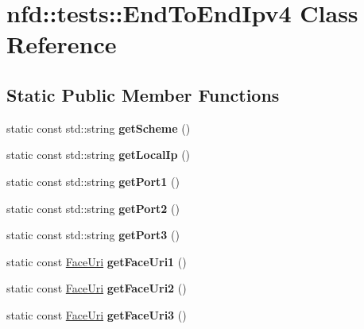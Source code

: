 \hypertarget{classnfd_1_1tests_1_1EndToEndIpv4}{}\section{nfd\+:\+:tests\+:\+:End\+To\+End\+Ipv4 Class Reference}
\label{classnfd_1_1tests_1_1EndToEndIpv4}
\subsection*{Static Public Member Functions}
\begin{DoxyCompactItemize}
\item 
static const std\+::string {\bfseries get\+Scheme} ()\hypertarget{classnfd_1_1tests_1_1EndToEndIpv4_a7c4e068f04b470f1078fffa3541acfc8}{}\label{classnfd_1_1tests_1_1EndToEndIpv4_a7c4e068f04b470f1078fffa3541acfc8}

\item 
static const std\+::string {\bfseries get\+Local\+Ip} ()\hypertarget{classnfd_1_1tests_1_1EndToEndIpv4_a4963dc57fb3bcc704a2dc2bdcd09b6a7}{}\label{classnfd_1_1tests_1_1EndToEndIpv4_a4963dc57fb3bcc704a2dc2bdcd09b6a7}

\item 
static const std\+::string {\bfseries get\+Port1} ()\hypertarget{classnfd_1_1tests_1_1EndToEndIpv4_a8757727abb1e46743972c6225240ef4d}{}\label{classnfd_1_1tests_1_1EndToEndIpv4_a8757727abb1e46743972c6225240ef4d}

\item 
static const std\+::string {\bfseries get\+Port2} ()\hypertarget{classnfd_1_1tests_1_1EndToEndIpv4_a9fb3d16ab607ad31ae1c3f54e1d9059f}{}\label{classnfd_1_1tests_1_1EndToEndIpv4_a9fb3d16ab607ad31ae1c3f54e1d9059f}

\item 
static const std\+::string {\bfseries get\+Port3} ()\hypertarget{classnfd_1_1tests_1_1EndToEndIpv4_af70963ee1f07ccbd85850bc13c5b4765}{}\label{classnfd_1_1tests_1_1EndToEndIpv4_af70963ee1f07ccbd85850bc13c5b4765}

\item 
static const \hyperlink{classndn_1_1util_1_1FaceUri}{Face\+Uri} {\bfseries get\+Face\+Uri1} ()\hypertarget{classnfd_1_1tests_1_1EndToEndIpv4_a9474865feb2d24e6ea1d2398b2544dd2}{}\label{classnfd_1_1tests_1_1EndToEndIpv4_a9474865feb2d24e6ea1d2398b2544dd2}

\item 
static const \hyperlink{classndn_1_1util_1_1FaceUri}{Face\+Uri} {\bfseries get\+Face\+Uri2} ()\hypertarget{classnfd_1_1tests_1_1EndToEndIpv4_a1b5a1c77e832624420e81ea7b56ba657}{}\label{classnfd_1_1tests_1_1EndToEndIpv4_a1b5a1c77e832624420e81ea7b56ba657}

\item 
static const \hyperlink{classndn_1_1util_1_1FaceUri}{Face\+Uri} {\bfseries get\+Face\+Uri3} ()\hypertarget{classnfd_1_1tests_1_1EndToEndIpv4_ae8f25d5de2a15aa75fbf57605a90f668}{}\label{classnfd_1_1tests_1_1EndToEndIpv4_ae8f25d5de2a15aa75fbf57605a90f668}

\end{DoxyCompactItemize}


